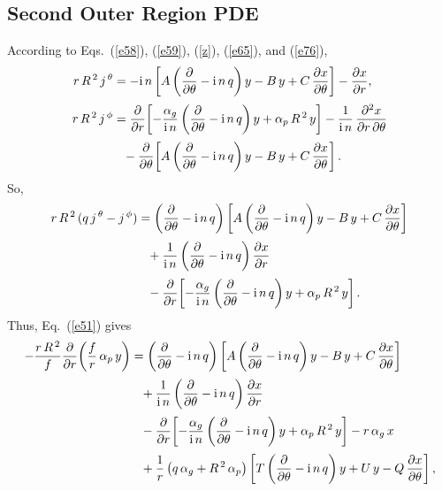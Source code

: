 \documentclass[12pt,prb,aps]{revtex4-1}
\begin{document}
\subsection{Second Outer Region PDE}
According to Eqs.~(\ref{e58}), (\ref{e59}), (\ref{z}), (\ref{e65}), and (\ref{e76}), 
\begin{align}
r\,R^{\,2}\,j^{\,\theta} &= -{\rm i}\,n\left[A\left(\frac{\partial}{\partial \theta}-{\rm i}\,n\,q\right)y-B\,y+C\,\frac{\partial x}{\partial\theta}\right]-\frac{\partial x}{\partial r},\\[0.5ex]
r\,R^{\,2}\,j^{\,\phi} &= \frac{\partial}{\partial r}\!\left[-\frac{\alpha_g}{{\rm i}\,n}\left(\frac{\partial}{\partial \theta}-{\rm i}\,n\,q\right)y+\alpha_p\,R^{\,2}\,y\right]-\frac{1}{{\rm i}\,n}\,\frac{\partial^2 x}{\partial r\,\partial\theta}\nonumber\\[0.5ex]&\phantom{=}-\frac{\partial}{\partial\theta}\!\left[A\left(\frac{\partial}{\partial \theta}-{\rm i}\,n\,q\right)y-B\,y+C\,\frac{\partial x}{\partial\theta}\right].
\end{align}
So,
\begin{align}
r\,R^{\,2}\,(q\,j^{\,\theta}-j^{\,\phi}) &=\left(\frac{\partial}{\partial\theta}-{\rm i}\,n\,q\right)\left[A\left(\frac{\partial}{\partial \theta}-{\rm i}\,n\,q\right)y-B\,y+C\,\frac{\partial x}{\partial\theta}\right]\nonumber\\[0.5ex]&\phantom= +\frac{1}{{\rm i}\,n}\left(\frac{\partial}{\partial\theta}-{\rm i}\,n\,q\right)\frac{\partial x}{\partial r} \nonumber\\[0.5ex]
&\phantom{=} -\frac{\partial}{\partial r}\!\left[-\frac{\alpha_g}{{\rm i}\,n}\left(\frac{\partial}{\partial \theta}-{\rm i}\,n\,q\right)y+\alpha_p\,R^{\,2}\,y\right].
\end{align}
Thus, Eq.~(\ref{e51}) gives
\begin{align}
-\frac{r\,R^{\,2}}{f}\frac{\partial}{\partial r}\!\left(\frac{f}{r}\,\alpha_p\,y\right)&=\left(\frac{\partial}{\partial\theta}-{\rm i}\,n\,q\right)\left[A\left(\frac{\partial}{\partial \theta}-{\rm i}\,n\,q\right)y-B\,y+C\,\frac{\partial x}{\partial\theta}\right]\nonumber\\[0.5ex]&\phantom= +\frac{1}{{\rm i}\,n}\left(\frac{\partial}{\partial\theta}-{\rm i}\,n\,q\right)\frac{\partial x}{\partial r} \nonumber\\[0.5ex]
&\phantom{=} -\frac{\partial}{\partial r}\!\left[-\frac{\alpha_g}{{\rm i}\,n}\left(\frac{\partial}{\partial \theta}-{\rm i}\,n\,q\right)y+\alpha_p\,R^{\,2}\,y\right]-r\,\alpha_g\,x\nonumber\\[0.5ex]
&\phantom{=} +\frac{1}{r}\left(q\,\alpha_g + R^{\,2}\,\alpha_p\right) \left[T\left(\frac{\partial}{\partial\theta}-{\rm i}\,n\,q\right)y + U\,y -Q\,\frac{\partial x}{\partial\theta}\right],
\end{align}
\end{document}
